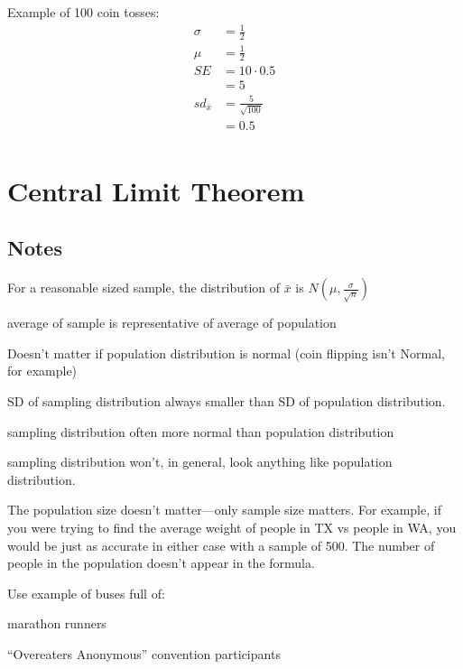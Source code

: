 \documentclass[letterpaper]{exam}
\begin{document}
  Example of 100 coin tosses:
  \begin{align*}
    \sigma        & = \frac{1}{2} \\
    \mu           & = \frac{1}{2} \\
    SE            & = 10 \cdot 0.5 \\
                  & = 5 \\
     sd_{\bar{x}} & = \frac{5}{\sqrt{100}} \\
                  & = 0.5 \\
  \end{align*}

  \section{Central Limit Theorem}
  \subsection{Notes}

  For a reasonable sized sample, the distribution of $\bar{x}$ is $N(\mu,
  \frac{\sigma}{\sqrt{n}})$

  \begin{itemize*}
    \item average of sample is representative of average of population
    \item Doesn't matter if population distribution is normal (coin flipping
      isn't Normal, for example)
    \item SD of sampling distribution always smaller than SD of population
      distribution.
    \item sampling distribution often more normal than population distribution

    \item sampling distribution won't, in general, look anything like population
      distribution.
  \end{itemize*}

  The population size doesn't matter---only sample size matters. For example, if
  you were trying to find the average weight of people in TX vs people in WA,
  you would be just as accurate in either case with a sample of 500. The number
  of people in the population doesn't appear in the formula.

  Use example of buses full of:
  \begin{itemize*}
    \item marathon runners
    \item ``Overeaters Anonymous'' convention participants
  \end{itemize*}
\end{document}
